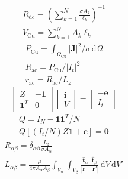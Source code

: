 \documentclass[journal,10pt]{IEEEtran}
\begin{document}
\hypertarget{E01}{}
\begin{equation}
\begin{gathered}
R_{\mathrm{dc}}=\left(\sum_{k=1}^{N}\frac{\sigma A_k}{\ell_k}\right)^{-1} \\
V_{\mathrm{Cu}}=\sum_{k=1}^{N}A_k\ell_k
\end{gathered}
\tag{1}\label{eq:E01}
\end{equation}
\hypertarget{E02}{}
\begin{equation}
\begin{gathered}
P_{\mathrm{Cu}}=\int_{\Omega_{\mathrm{Cu}}}|\mathbf J|^2/\sigma\,\mathrm d\Omega \\
R_{\mathrm{ac}}=P_{\mathrm{Cu}}/|I_t|^2 \\
r_{\mathrm{ac}}=R_{\mathrm{ac}}/L_z
\end{gathered}
\tag{2}\label{eq:E02}
\end{equation}
\hypertarget{E04}{}\begin{equation}\begin{bmatrix} Z&-\mathbf1\\ \mathbf1^T&0\end{bmatrix}\begin{bmatrix}\mathbf i\\V\end{bmatrix}=\begin{bmatrix}-\mathbf e\\I_t\end{bmatrix}\tag{3}\label{eq:E04}\end{equation}
\hypertarget{E05}{}
\begin{equation}
\begin{gathered}
Q=I_N-\mathbf1\mathbf1^T/N \\
Q\left[(I_t/N)Z\mathbf1+\mathbf e\right]=\mathbf0
\end{gathered}
\tag{4}\label{eq:E05}
\end{equation}
\hypertarget{E08}{}
\begin{equation}
\begin{gathered}
R_{\alpha\beta}=\delta_{\alpha\beta}\frac{L_z}{\sigma A_\alpha} \\
L_{\alpha\beta}=\frac{\mu}{4\pi A_\alpha A_\beta}\int_{V_\alpha}\int_{V_\beta}\frac{\hat{\mathbf t}_\alpha\cdot\hat{\mathbf t}_\beta}{|\mathbf r-\mathbf r'|}\,\mathrm dV\,\mathrm dV'
\end{gathered}
\tag{5}\label{eq:E08}
\end{equation}
\end{document}
